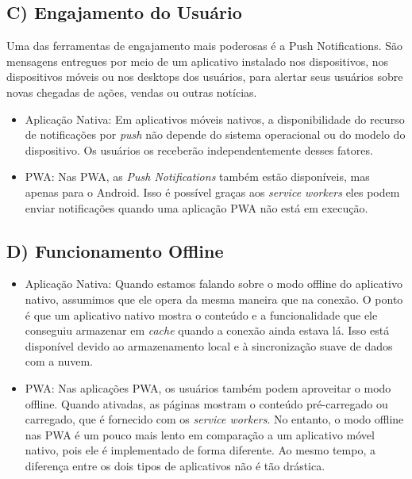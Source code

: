 \subsection*{C) Engajamento do Usuário}
Uma das ferramentas de engajamento mais poderosas é a Push Notifications. São mensagens entregues por meio de um aplicativo instalado nos dispositivos, nos dispositivos móveis ou nos desktops dos usuários, para alertar seus usuários sobre novas chegadas de ações, vendas ou outras notícias.
\begin{itemize}
	
	\item Aplicação Nativa: Em aplicativos móveis nativos, a disponibilidade do recurso de notificações por \textit{push} não depende do sistema operacional ou do modelo do dispositivo. Os usuários os receberão independentemente desses fatores.
	
	\item PWA: Nas \ac{PWA}, as \textit{Push Notifications} também estão disponíveis, mas apenas para o Android. Isso é possível graças aos \textit{service workers} eles podem enviar notificações quando uma aplicação \ac{PWA} não está em execução.
\end{itemize}

\subsection*{D) Funcionamento Offline}

\begin{itemize}
	
	\item Aplicação Nativa: Quando estamos falando sobre o modo offline do aplicativo nativo, assumimos que ele opera da mesma maneira que na conexão. O ponto é que um aplicativo nativo mostra o conteúdo e a funcionalidade que ele conseguiu armazenar em \textit{cache} quando a conexão ainda estava lá. Isso está disponível devido ao armazenamento local e à sincronização suave de dados com a nuvem.
	
	\item PWA: Nas aplicações \ac{PWA}, os usuários também podem aproveitar o modo offline. Quando ativadas, as páginas mostram o conteúdo pré-carregado ou carregado, que é fornecido com os \textit{service workers}. No entanto, o modo offline nas \ac{PWA} é um pouco mais lento em comparação a um aplicativo móvel nativo, pois ele é implementado de forma diferente. Ao mesmo tempo, a diferença entre os dois tipos de aplicativos não é tão drástica.
\end{itemize}
